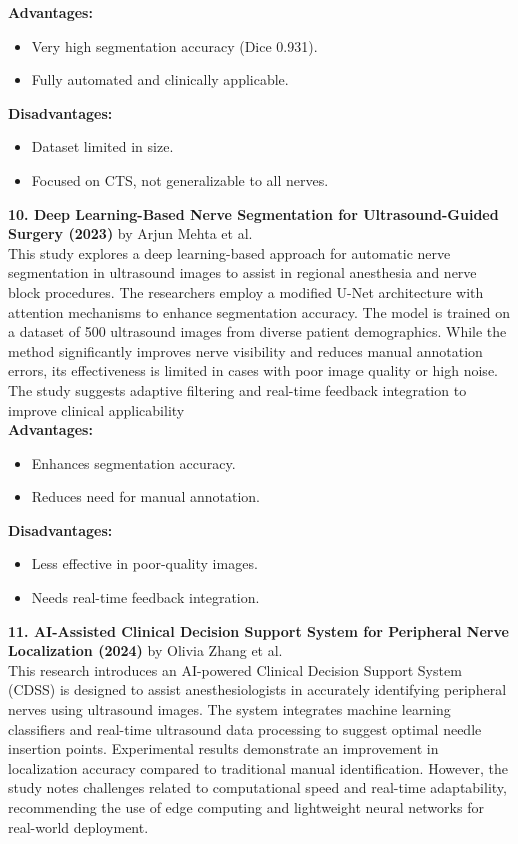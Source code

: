 \documentclass[12pt]{article}
\begin{document}
\textbf{Advantages:}
\begin{itemize}
    \item Very high segmentation accuracy (Dice 0.931).
    \item Fully automated and clinically applicable.
\end{itemize}

\textbf{Disadvantages:}
\begin{itemize}
    \item Dataset limited in size.
    \item Focused on CTS, not generalizable to all nerves.
\end{itemize}

\vspace{10pt}

\noindent \textbf{10. Deep Learning-Based Nerve Segmentation for Ultrasound-Guided Surgery (2023)} by Arjun Mehta et al.\\
This study explores a deep learning-based approach for
automatic nerve segmentation in ultrasound images to assist in regional anesthesia and nerve block
procedures. The researchers employ a modified U-Net architecture with attention mechanisms
to enhance segmentation accuracy. The model is trained on a dataset of 500 ultrasound images
from diverse patient demographics. While the method significantly improves nerve visibility and reduces manual annotation errors, its effectiveness is limited in cases with poor image quality or
high noise. The study suggests adaptive filtering and real-time feedback integration to improve
clinical applicability\\

\textbf{Advantages:}
\begin{itemize}
    \item Enhances segmentation accuracy.
    \item Reduces need for manual annotation.
\end{itemize}

\textbf{Disadvantages:}
\begin{itemize}
    \item Less effective in poor-quality images.
    \item Needs real-time feedback integration.
\end{itemize}

\vspace{10pt}
\newpage
\noindent \textbf{11. AI-Assisted Clinical Decision Support System for Peripheral Nerve Localization (2024)} by Olivia Zhang et al.\\
This research introduces an AI-powered
Clinical Decision Support System (CDSS) is designed to assist anesthesiologists in accurately identifying peripheral nerves using ultrasound images. The system integrates machine learning classifiers and real-time ultrasound data processing to suggest optimal needle insertion points. Experimental results demonstrate an improvement in localization accuracy compared to traditional
manual identification. However, the study notes challenges related to computational speed and
real-time adaptability, recommending the use of edge computing and lightweight neural networks
for real-world deployment.\\
\end{document}

